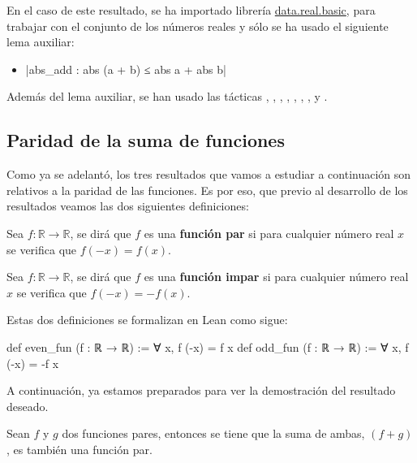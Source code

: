En el caso de este resultado, se ha importado librería
\href{https://github.com/leanprover-community/mathlib/blob/master/src/data/real/basic.lean}{data.real.basic},
para trabajar con el conjunto de los números reales y sólo se ha usado
el siguiente lema auxiliar:
\begin{itemize}
\item {}|abs_add : abs (a + b) ≤ abs a + abs b|
\end{itemize}

Además del lema auxiliar, se han usado las tácticas
,
,
,
,
,
,
,
 y
.

\subsection{Paridad de la suma de funciones}

Como ya se adelantó, los tres resultados que vamos a estudiar a
continuación son relativos a la paridad de las funciones. Es por eso,
que previo al desarrollo de los resultados veamos las dos siguientes
definiciones:

\begin{definicion}\label{funpar}
  Sea \(f: ℝ → ℝ\), se dirá que \(f\) es una \textbf{función par} si
  para cualquier número real \(x\) se verifica que \(f(-x)=f(x)\).
\end{definicion}

\begin{definicion}\label{funimpar}
  Sea \(f: ℝ → ℝ\), se dirá que \(f\) es una \textbf{función impar} si
  para cualquier número real \(x\) se verifica que \(f(-x)=-f(x)\).
\end{definicion}

Estas dos definiciones se formalizan en Lean como sigue:
\begin{leancode}
def even_fun (f : ℝ → ℝ) := ∀ x, f (-x) = f x
def odd_fun  (f : ℝ → ℝ) := ∀ x, f (-x) = -f x
\end{leancode}

A continuación, ya estamos preparados para ver la demostración del
resultado deseado.

\begin{teorema}
  Sean \(f\) y \(g\) dos funciones pares, entonces
  se tiene que la suma de ambas, \((f+g)\), es también una función par.
\end{teorema}

